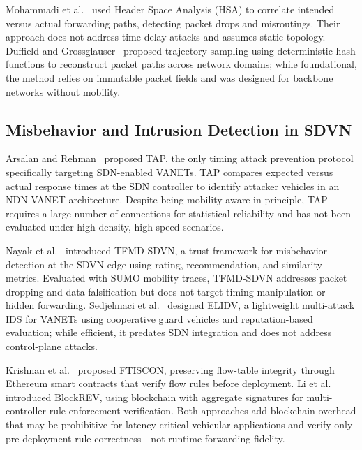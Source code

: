 \documentclass[12pt, a4paper]{report}
\begin{document}
Mohammadi et al.~\cite{Mohammadi2016} used Header Space Analysis (HSA) to correlate intended versus actual forwarding paths, detecting packet drops and misroutings. Their approach does not address time delay attacks and assumes static topology. Duffield and Grossglauser~\cite{Duffield2001} proposed trajectory sampling using deterministic hash functions to reconstruct packet paths across network domains; while foundational, the method relies on immutable packet fields and was designed for backbone networks without mobility.

\subsection{Misbehavior and Intrusion Detection in SDVN}
\label{sec:sdvn_detection}

Arsalan and Rehman~\cite{Arsalan2018} proposed TAP, the only timing attack prevention protocol specifically targeting SDN-enabled VANETs. TAP compares expected versus actual response times at the SDN controller to identify attacker vehicles in an NDN-VANET architecture. Despite being mobility-aware in principle, TAP requires a large number of connections for statistical reliability and has not been evaluated under high-density, high-speed scenarios.

Nayak et al.~\cite{Nayak2022} introduced TFMD-SDVN, a trust framework for misbehavior detection at the SDVN edge using rating, recommendation, and similarity metrics. Evaluated with SUMO mobility traces, TFMD-SDVN addresses packet dropping and data falsification but does not target timing manipulation or hidden forwarding. Sedjelmaci et al.~\cite{Sedjelmaci2014} designed ELIDV, a lightweight multi-attack IDS for VANETs using cooperative guard vehicles and reputation-based evaluation; while efficient, it predates SDN integration and does not address control-plane attacks.

Krishnan et al.~\cite{Krishnan2023} proposed FTISCON, preserving flow-table integrity through Ethereum smart contracts that verify flow rules before deployment. Li et al.~\cite{Li2022BlockREV} introduced BlockREV, using blockchain with aggregate signatures for multi-controller rule enforcement verification. Both approaches add blockchain overhead that may be prohibitive for latency-critical vehicular applications and verify only pre-deployment rule correctness—not runtime forwarding fidelity.
\end{document}
